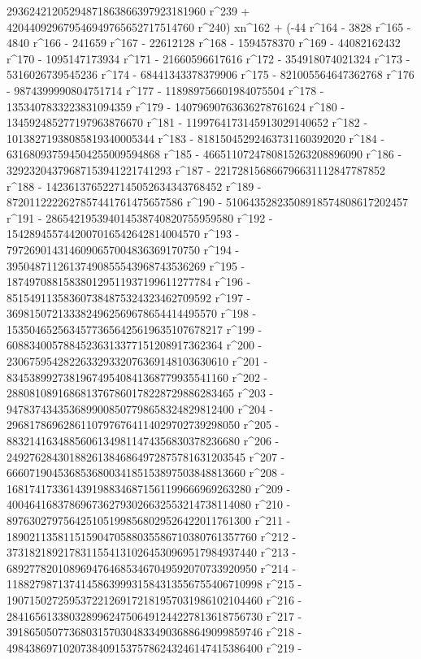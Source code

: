        29362421205294871863866397923181960 r^239 + 
       420440929679546949765652717514760 r^240) xn^162 + (-44 r^164 - 
       3828 r^165 - 4840 r^166 - 241659 r^167 - 22612128 r^168 - 
       1594578370 r^169 - 44082162432 r^170 - 1095147173934 r^171 - 
       21660596617616 r^172 - 354918074021324 r^173 - 
       5316026739545236 r^174 - 68441343378379906 r^175 - 
       821005564647362768 r^176 - 9874399990804751714 r^177 - 
       118989756601984075504 r^178 - 1353407833223831094359 r^179 - 
       14079690763636278761624 r^180 - 
       134592485277197963876670 r^181 - 
       1199764173145913029140652 r^182 - 
       10138271938085819340005344 r^183 - 
       81815045292463731160392020 r^184 - 
       631680937594504255009594868 r^185 - 
       4665110724780815263208896090 r^186 - 
       32923204379687153941221741293 r^187 - 
       221728156866796631112847787852 r^188 - 
       1423613765227145052634343768452 r^189 - 
       8720112222627857441761475657586 r^190 - 
       51064352823508918574808617202457 r^191 - 
       286542195394014538740820755959580 r^192 - 
       1542894557442007016542642814004570 r^193 - 
       7972690143146090657004836369170750 r^194 - 
       39504871126137490855543968743536269 r^195 - 
       187497088158380129511937199611277784 r^196 - 
       851549113583607384875324323462709592 r^197 - 
       3698150721333824962569678654414495570 r^198 - 
       15350465256345773656425619635107678217 r^199 - 
       60883400578845236313377151208917362364 r^200 - 
       230675954282263329332076369148103630610 r^201 - 
       834538992738196749540841368779935541160 r^202 - 
       2880810891686813767860178228729886283465 r^203 - 
       9478374343536899008507798658324829812400 r^204 - 
       29681786962861107976764114029702739298050 r^205 - 
       88321416348856061349811474356830378236680 r^206 - 
       249276284301882613846864972875781631203545 r^207 - 
       666071904536853680034185153897503848813660 r^208 - 
       1681741733614391988346871561199666969263280 r^209 - 
       4004641683786967362793026632553214738114080 r^210 - 
       8976302797564251051998568029526422011761300 r^211 - 
       18902113581151590470588035586710380761357760 r^212 - 
       37318218921783115541310264530969517984937440 r^213 - 
       68927782010896947646853467049592070733920950 r^214 - 
       118827987137414586399931584313556755406710998 r^215 - 
       190715027259537221269172181957031986102104460 r^216 - 
       284165613380328996247506491244227813618756730 r^217 - 
       391865050773680315703048334903688649099859746 r^218 - 
       498438697102073840915375786243246147415386400 r^219 - 
